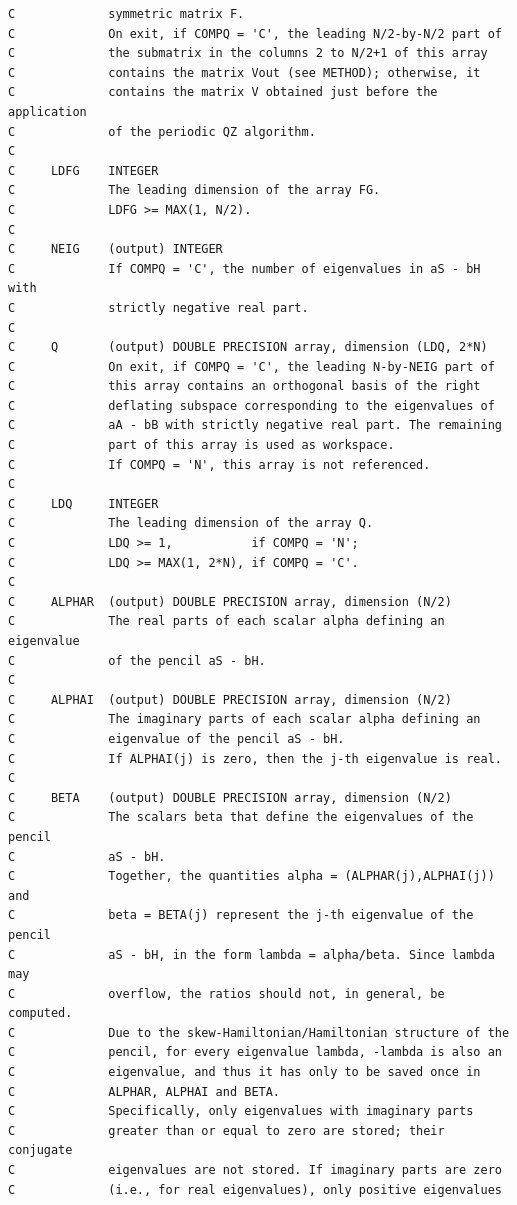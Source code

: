 \documentclass[a4paper,10pt]{article}
\begin{document}
\begin{verbatim}
C             symmetric matrix F.
C             On exit, if COMPQ = 'C', the leading N/2-by-N/2 part of
C             the submatrix in the columns 2 to N/2+1 of this array
C             contains the matrix Vout (see METHOD); otherwise, it
C             contains the matrix V obtained just before the application
C             of the periodic QZ algorithm.
C
C     LDFG    INTEGER
C             The leading dimension of the array FG.
C             LDFG >= MAX(1, N/2).
C
C     NEIG    (output) INTEGER
C             If COMPQ = 'C', the number of eigenvalues in aS - bH with
C             strictly negative real part.
C
C     Q       (output) DOUBLE PRECISION array, dimension (LDQ, 2*N)
C             On exit, if COMPQ = 'C', the leading N-by-NEIG part of
C             this array contains an orthogonal basis of the right
C             deflating subspace corresponding to the eigenvalues of
C             aA - bB with strictly negative real part. The remaining
C             part of this array is used as workspace.
C             If COMPQ = 'N', this array is not referenced.
C
C     LDQ     INTEGER
C             The leading dimension of the array Q.
C             LDQ >= 1,           if COMPQ = 'N';
C             LDQ >= MAX(1, 2*N), if COMPQ = 'C'.
C
C     ALPHAR  (output) DOUBLE PRECISION array, dimension (N/2)
C             The real parts of each scalar alpha defining an eigenvalue
C             of the pencil aS - bH.
C
C     ALPHAI  (output) DOUBLE PRECISION array, dimension (N/2)
C             The imaginary parts of each scalar alpha defining an
C             eigenvalue of the pencil aS - bH.
C             If ALPHAI(j) is zero, then the j-th eigenvalue is real.
C
C     BETA    (output) DOUBLE PRECISION array, dimension (N/2)
C             The scalars beta that define the eigenvalues of the pencil
C             aS - bH.
C             Together, the quantities alpha = (ALPHAR(j),ALPHAI(j)) and
C             beta = BETA(j) represent the j-th eigenvalue of the pencil
C             aS - bH, in the form lambda = alpha/beta. Since lambda may
C             overflow, the ratios should not, in general, be computed.
C             Due to the skew-Hamiltonian/Hamiltonian structure of the
C             pencil, for every eigenvalue lambda, -lambda is also an
C             eigenvalue, and thus it has only to be saved once in
C             ALPHAR, ALPHAI and BETA.
C             Specifically, only eigenvalues with imaginary parts
C             greater than or equal to zero are stored; their conjugate
C             eigenvalues are not stored. If imaginary parts are zero
C             (i.e., for real eigenvalues), only positive eigenvalues

\end{verbatim}
\end{document}
